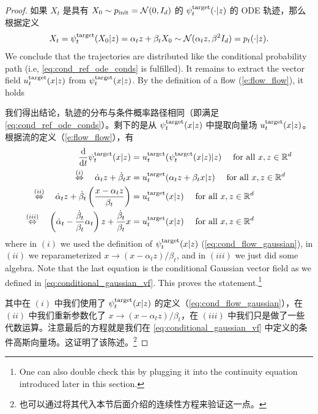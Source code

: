 \begin{examplebox}
\begin{proof}
如果 $X_t$ 是具有 $X_0\sim p_{\rm{init}} = \mathcal{N}(0,I_d)$ 的 $\psi^{\text{target}}_t(\cdot|z)$ 的 ODE 轨迹，那么根据定义
\begin{align*}
    X_t = \psi^{\text{target}}_t(X_0|z) = \alpha_t z + \beta_t X_0 \sim \mathcal{N}(\alpha_t z,\beta^2 I_d) = p_t(\cdot|z).
\end{align*}
We conclude that the trajectories are distributed like the conditional probability path (i.e, \cref{eq:cond_ref_ode_conds} is fulfilled). It remains to extract the vector field $u^{\text{target}}_t(x|z)$ from $\psi^{\text{target}}_t(x|z)$. By the definition of a flow (\cref{e:flow_flow}), it holds

我们得出结论，轨迹的分布与条件概率路径相同（即满足 \cref{eq:cond_ref_ode_conds}）。剩下的是从 $\psi^{\text{target}}_t(x|z)$ 中提取向量场 $u^{\text{target}}_t(x|z)$。根据流的定义（\cref{e:flow_flow}），有
\begin{align*}
      \frac{\mathrm{d}}{\mathrm{d} t}\psi^{\text{target}}_{t}(x|z) &= u^{\text{target}}_t(\psi^{\text{target}}_t(x|z)|z)\quad \text{ for all }x,z\in\mathbb{R}^d\\
    \overset{(i)}{\Leftrightarrow} \quad \dot{\alpha}_tz+\dot{\beta}_tx &= u^{\text{target}}_t(\alpha_tz+\beta_t x|z)\quad \text{ for all }x,z\in\mathbb{R}^d\\
    \overset{(ii)}{\Leftrightarrow} \quad \dot{\alpha}_tz+\dot{\beta}_t\left(\frac{x-\alpha_tz}{\beta_t}\right)&= u^{\text{target}}_t(x|z)\quad \text{ for all }x,z\in\mathbb{R}^d\\
    \overset{(iii)}{\Leftrightarrow} \quad\left(\dot{\alpha}_t-\frac{\dot{\beta}_t}{\beta_t}\alpha_t\right)z+\frac{\dot{\beta}_t}{\beta_t}x &= u^{\text{target}}_t(x|z)\quad \text{ for all }x,z\in\mathbb{R}^d
\end{align*}
where in $(i)$ we used the definition of $\psi^{\text{target}}_t(x|z)$ (\cref{eq:cond_flow_gaussian}), in $(ii)$ we reparameterized $x\rightarrow (x-\alpha_t z)/\beta_t$, and in $(iii)$ we just did some algebra. Note that the last equation is the conditional Gaussian vector field as we defined in \cref{eq:conditional_gaussian_vf}. This proves the statement.\footnote{One can also double check this by plugging it into the continuity equation introduced later in this section.}

其中在 $(i)$ 中我们使用了 $\psi^{\text{target}}_t(x|z)$ 的定义（\cref{eq:cond_flow_gaussian}），在 $(ii)$ 中我们重新参数化了 $x\rightarrow (x-\alpha_t z)/\beta_t$，在 $(iii)$ 中我们只是做了一些代数运算。注意最后的方程就是我们在 \cref{eq:conditional_gaussian_vf} 中定义的条件高斯向量场。这证明了该陈述。\footnote{也可以通过将其代入本节后面介绍的连续性方程来验证这一点。}
\end{proof}
\end{examplebox}

